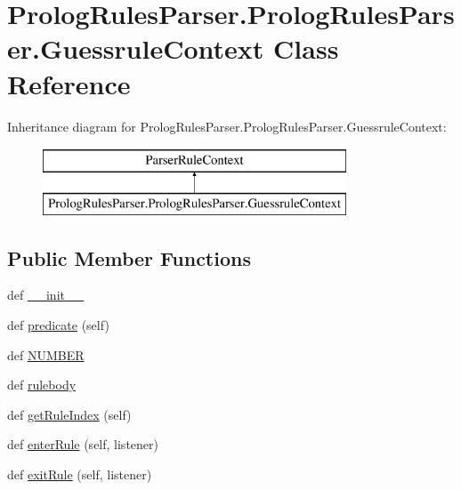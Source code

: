 \hypertarget{class_prolog_rules_parser_1_1_prolog_rules_parser_1_1_guessrule_context}{}\section{Prolog\+Rules\+Parser.\+Prolog\+Rules\+Parser.\+Guessrule\+Context Class Reference}
\label{class_prolog_rules_parser_1_1_prolog_rules_parser_1_1_guessrule_context}
Inheritance diagram for Prolog\+Rules\+Parser.\+Prolog\+Rules\+Parser.\+Guessrule\+Context\+:\begin{figure}[H]
\begin{center}
\leavevmode
\includegraphics[height=2.000000cm]{class_prolog_rules_parser_1_1_prolog_rules_parser_1_1_guessrule_context}
\end{center}
\end{figure}
\subsection*{Public Member Functions}
\begin{DoxyCompactItemize}
\item 
def \hyperlink{class_prolog_rules_parser_1_1_prolog_rules_parser_1_1_guessrule_context_ae1a548898a05a40db4e5e00dfc194c20}{\+\_\+\+\_\+init\+\_\+\+\_\+}
\item 
def \hyperlink{class_prolog_rules_parser_1_1_prolog_rules_parser_1_1_guessrule_context_a2348ed6102b18d1f34e905c302c38bd2}{predicate} (self)
\item 
def \hyperlink{class_prolog_rules_parser_1_1_prolog_rules_parser_1_1_guessrule_context_ab4c841a5e28076ef1bc7ed425f82271b}{N\+U\+M\+B\+E\+R}
\item 
def \hyperlink{class_prolog_rules_parser_1_1_prolog_rules_parser_1_1_guessrule_context_ae688607e95c8a038062b890164d01203}{rulebody}
\item 
def \hyperlink{class_prolog_rules_parser_1_1_prolog_rules_parser_1_1_guessrule_context_a5df7b953cfd85b7aa06564bfd92dd0be}{get\+Rule\+Index} (self)
\item 
def \hyperlink{class_prolog_rules_parser_1_1_prolog_rules_parser_1_1_guessrule_context_af3fa7ee052296e884170cca95ed8fa34}{enter\+Rule} (self, listener)
\item 
def \hyperlink{class_prolog_rules_parser_1_1_prolog_rules_parser_1_1_guessrule_context_aea1f6d1f13e01a7eb2c5c0203e2fd555}{exit\+Rule} (self, listener)
\end{DoxyCompactItemize}
